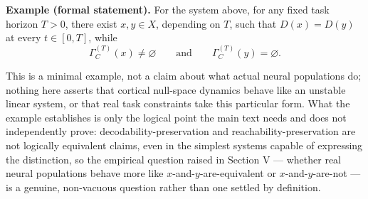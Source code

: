 \documentclass[11pt]{article}
\begin{document}
\textbf{Example (formal statement).} For the system above, for any fixed task horizon $T > 0$, there exist $x, y \in X$, depending on $T$, such that $D(x) = D(y)$ at every $t \in [0,T]$, while
\[
\Gamma_C^{(T)}(x) \neq \varnothing \qquad \text{and} \qquad \Gamma_C^{(T)}(y) = \varnothing.
\]

This is a minimal example, not a claim about what actual neural populations do; nothing here asserts that cortical null-space dynamics behave like an unstable linear system, or that real task constraints take this particular form. What the example establishes is only the logical point the main text needs and does not independently prove: decodability-preservation and reachability-preservation are not logically equivalent claims, even in the simplest systems capable of expressing the distinction, so the empirical question raised in Section V — whether real neural populations behave more like $x$-and-$y$-are-equivalent or $x$-and-$y$-are-not — is a genuine, non-vacuous question rather than one settled by definition.
\end{document}

